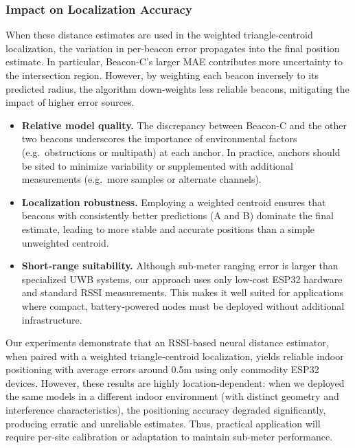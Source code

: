 \subsubsection{Impact on Localization Accuracy}

When these distance estimates are used in the weighted triangle‑centroid localization, the variation in per‑beacon error propagates into the final position estimate.  In particular, Beacon-C’s larger MAE contributes more uncertainty to the intersection region.  However, by weighting each beacon inversely to its predicted radius, the algorithm down‑weights less reliable beacons, mitigating the impact of higher error sources.

\begin{itemize}
\item \textbf{Relative model quality.}  The discrepancy between Beacon-C and the other two beacons underscores the importance of environmental factors (e.g.\ obstructions or multipath) at each anchor.  In practice, anchors should be sited to minimize variability or supplemented with additional measurements (e.g.\ more samples or alternate channels).
\item \textbf{Localization robustness.}  Employing a weighted centroid ensures that beacons with consistently better predictions (A and B) dominate the final estimate, leading to more stable and accurate positions than a simple unweighted centroid.
\item \textbf{Short‑range suitability.}  Although sub‑meter ranging error is larger than specialized UWB systems, our approach uses only low‑cost ESP32 hardware and standard RSSI measurements.  This makes it well suited for applications where compact, battery‑powered nodes must be deployed without additional infrastructure.

\end{itemize}

Our experiments demonstrate that an RSSI‑based neural distance estimator, when paired with a weighted triangle‑centroid localization, yields reliable indoor positioning with average errors around 0.5m using only commodity ESP32 devices. However, these results are highly location‑dependent: when we deployed the same models in a different indoor environment (with distinct geometry and interference characteristics), the positioning accuracy degraded significantly, producing erratic and unreliable estimates. Thus, practical application will require per‑site calibration or adaptation to maintain sub‑meter performance.